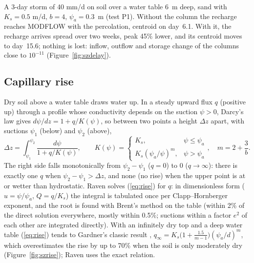 \begin{example}
A 3-day storm of 40 mm/d on soil over a water table 6~m deep, sand with $K_s=0.5$ m/d, $b=4$, $\psi_a=0.3$~m (test P1).
Without the column the recharge reaches MODFLOW with the percolation, centroid on day~6.1. With it, the recharge
arrives spread over two weeks, peak 45\% lower, and its centroid moves to day~15.6; nothing is lost: inflow, outflow
and storage change of the columns close to $10^{-11}$ (Figure~\ref{fig:szdelay}).
\end{example}





\subsection{Capillary rise}\label{sec:szcaprise}
Dry soil above a water table draws water up. In a steady upward flux $q$ (positive up) through a profile whose
conductivity depends on the suction $\psi>0$, Darcy's law gives $d\psi/dz=1+q/K(\psi)$, so between two points a height
$\Delta z$ apart, with suctions $\psi_1$ (below) and $\psi_2$ (above),
\begin{equation}\label{eq:rise}
\Delta z=\int_{\psi_1}^{\psi_2}\frac{d\psi}{1+q/K(\psi)},\qquad K(\psi)=\begin{cases}K_s,&\psi\le\psi_a\\K_s(\psi_a/\psi)^m,&\psi>\psi_a\end{cases},\quad m=2+\frac3b .
\end{equation}
The right side falls monotonically from $\psi_2-\psi_1$ ($q=0$) to 0 ($q\to\infty$): there is exactly one $q$ when
$\psi_2-\psi_1>\Delta z$, and none (no rise) when the upper point is at or wetter than hydrostatic. Raven solves
(\ref{eq:rise}) for $q$: in dimensionless form ($u=\psi/\psi_a$, $Q=q/K_s$) the integral is tabulated once per
Clapp--Hornberger exponent, and the root is found with Brent's method on the table (within 2\% of the direct solution
everywhere, mostly within 0.5\%; suctions within a factor $e^2$ of each other are integrated directly). With an
infinitely dry top and a deep water table (\ref{eq:rise}) tends to Gardner's classic result
\cite{gardner1958,eagleson1978}, $q_\infty=K_s\big(1+\tfrac{1.5}{m-1}\big)(\psi_a/d)^m$, which overestimates the rise by
up to 70\% when the soil is only moderately dry (Figure~\ref{fig:szrise}); Raven uses the exact relation.

